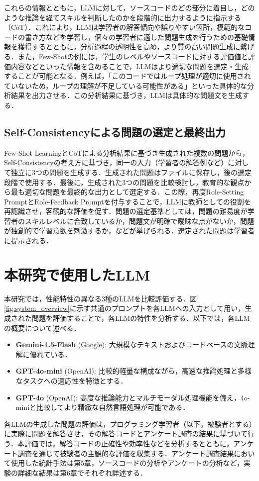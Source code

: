 \documentclass[11pt]{jreport}
\begin{document}
これらの情報とともに，LLMに対して，ソースコードのどの部分に着目し，どのような推論を経てスキルを判断したのかを段階的に出力するように指示する（CoT）．これにより，LLMは学習者の解答傾向や誤りやすい箇所，模範的なコードの書き方などを学習し，個々の学習者に適した問題生成を行うための基礎情報を獲得するとともに，分析過程の透明性を高め，より質の高い問題生成に繋げる．また，Few-Shotの例には，学生のレベルやソースコードに対する評価値と評価内容などといった情報を含めることで，LLMはより適切な問題を選定・生成することが可能となる．例えば，「このコードではループ処理が適切に使用されていないため，ループの理解が不足している可能性がある」といった具体的な分析結果を出力させる．この分析結果に基づき，LLMは具体的な問題文を生成する．


\subsection{Self-Consistencyによる問題の選定と最終出力}

Few-Shot LearningとCoTによる分析結果に基づき生成された複数の問題から，Self-Consistencyの考え方に基づき，同一の入力（学習者の解答例など）に対して独立に3つの問題を生成する．生成された問題はファイルに保存し，後の選定段階で使用する．最後に，生成された3つの問題を比較検討し，教育的な観点から最も適切な問題を最終的な出力として選定する．この際，再度Role-Setting PromptとRole-Feedback Promptを付与することで，LLMに教師としての役割を再認識させ，客観的な評価を促す．問題の選定基準としては，問題の難易度が学習者のスキルレベルに合致しているか，問題文が明確で曖昧な点がないか，問題が独創的で学習意欲を刺激するか，などが挙げられる．選定された問題は学習者に提示される．


\section{本研究で使用したLLM}
本研究では，性能特性の異なる3種のLLMを比較評価する．図\ref{fig:system_overview}に示す共通のプロンプトを各LLMへの入力として用い，生成された問題を評価することで，各LLMの特性を分析する．以下では，各LLMの概要について述べる．
\begin{itemize}
\item \textbf{Gemini-1.5-Flash} (Google): 大規模なテキストおよびコードベースの文脈理解に優れている．
\item \textbf{GPT-4o-mini} (OpenAI): 比較的軽量な構成ながら，高速な推論処理と多様なタスクへの適応性を特徴とする．
\item \textbf{GPT-4o} (OpenAI): 高度な推論能力とマルチモーダル処理機能を備え，4o-miniと比較してより精緻な自然言語処理が可能である．
\end{itemize}
各LLMの生成した問題の評価は，プログラミング学習者（以下，被験者とする）に実際に問題を解答させ，その解答コードとアンケート調査の結果に基づいて行う．本評価では，解答コードの正確性や効率性などを分析するとともに，アンケート調査を通じて被験者の主観的な評価を収集する．アンケート調査結果において使用した統計手法は第5章，ソースコードの分析やアンケートの分析など，実験の詳細な結果は第6章でそれぞれ詳述する．
\end{document}
